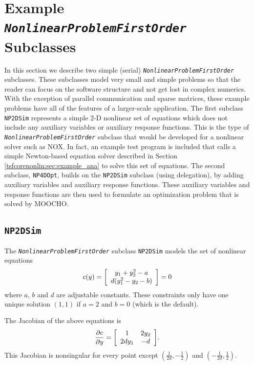 %
\section{Example \texttt{\textit{NonlinearProblemFirstOrder}} Subclasses}
\label{tsfcorenonlin:sec:example_nps}
%

In this section we describe two simple (serial)
\texttt{\textit{Nonlinear\-Problem\-First\-Order}} subclasses.  These
subclasses model very small and simple problems so that the reader can
focus on the software structure and not get lost in complex numerics.
With the exception of parallel communication and sparse matrices,
these example problems have all of the features of a larger-scale
application.  The first subclass \texttt{NP2DSim} represents a simple
2-D nonlinear set of equations which does not include any auxiliary
variables or auxiliary response functions.  This is the type of
\texttt{\textit{Nonlinear\-Problem\-First\-Order}} subclass that would
be developed for a nonlinear solver such as NOX.  In fact, an example
test program is included that calls a simple Newton-based equation
solver described in Section
\ref{tsfcorenonlin:sec:example_ana} to solve this set of equations.
The second subclass, \texttt{NP4DOpt}, builds on the \texttt{NP2DSim}
subclass (using delegation), by adding auxiliary variables and
auxiliary response functions.  These auxiliary variables and response
functions are then used to formulate an optimization problem that is
solved by MOOCHO.

%
\subsection{\texttt{NP2DSim}}
\label{tsfcorenonlin:sec:np2dsim}
%

The \texttt{\textit{Nonlinear\-Problem\-First\-Order}} subclass
\texttt{NP2DSim} models the set of nonlinear equations
%
\begin{equation}
c(y) = {\bmat{c} y_1 + y_2^2 - a \\ d (y_1^2 - y_2 - b) \emat} = 0
\label{tsfcorenonlin:equ:np2dsim}
\end{equation}
%
where $a$, $b$ and $d$ are adjustable constants.  These constraints
only have one unique solution $(1,1)$ if $a = 2$ and $b = 0$ (which is
the default).

The Jacobian of the above equations is
%
\begin{equation}
\frac{\partial c}{\partial y} =
{\bmat{cc}
  1        &  2 y_2 \\
  2 d y_1  &   -d
\emat}.
\end{equation}
%
This Jacobian is nonsingular for every point except
$(\frac{1}{2d},-\frac{1}{2})$ and $(-\frac{1}{2d},\frac{1}{2})$.

